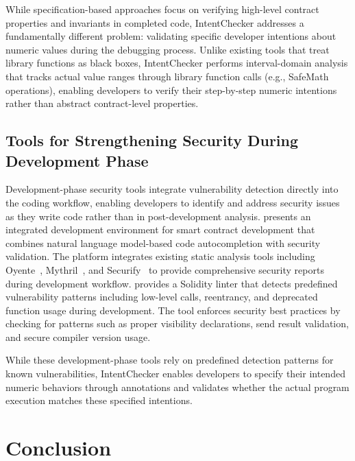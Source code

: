 \documentclass[pdflatex,sn-basic]{sn-jnl}%
\theoremstyle{thmstyleone}%
\theoremstyle{thmstyletwo}%
\theoremstyle{thmstylethree}%
\begin{document}
While specification-based approaches focus on verifying high-level contract properties and invariants in completed code,
IntentChecker addresses a fundamentally different problem: validating specific developer intentions about numeric values during the debugging process.
Unlike existing tools that treat library functions as black boxes, IntentChecker performs interval-domain analysis
that tracks actual value ranges through library function calls (e.g., SafeMath operations),
enabling developers to verify their step-by-step numeric intentions rather than abstract contract-level properties.

\subsection{Tools for Strengthening Security During Development Phase}
Development-phase security tools integrate vulnerability detection directly into the coding workflow, enabling developers to identify and address security issues as they write code rather than in post-development analysis.
\citep{making} presents an integrated development environment for smart contract development that combines natural language model-based code autocompletion with security validation.
The platform integrates existing static analysis tools including Oyente~\citep{oyente}, Mythril~\citep{mythril}, and Securify~\citep{securify} to provide comprehensive security reports during development workflow.
\citep{solhint} provides a Solidity linter that detects predefined vulnerability patterns including low-level calls, reentrancy, and deprecated function usage during development.
The tool enforces security best practices by checking for patterns such as proper visibility declarations, send result validation, and secure compiler version usage.

While these development-phase tools rely on predefined detection patterns for known vulnerabilities,
IntentChecker enables developers to specify their intended numeric behaviors through annotations and validates whether the actual program execution matches these specified intentions.

\section{Conclusion}\label{sec:conclusion}
\newif\ifshowack
\showackfalse

\ifshowack
  \section*{Acknowledgment}
\fi
\end{document}

